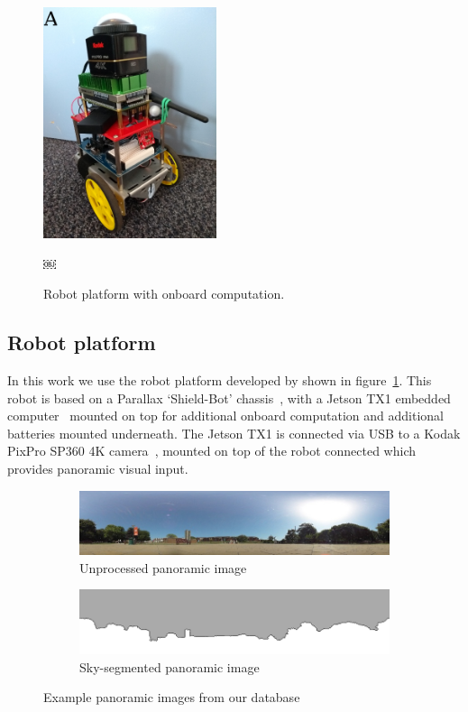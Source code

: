 \documentclass[letterpaper]{article}
\begin{document}
\begin{figure}[t]
    \centering
    \includegraphics[width=2in]{figures/robot.jpg}
    \caption{Robot platform with onboard computation.}￼
    \label{fig:robot}
\end{figure}

\subsection{Robot platform}
\label{sec:robot_platform}
In this work we use the robot platform developed by \citet{Domcsek2018} shown in figure~\ref{fig:robot}.
This robot is based on a Parallax `Shield-Bot' chassis~\citep{ParallaxInc}, with a Jetson TX1 embedded computer~\citep{NVIDIACorporation2016} mounted on top for additional onboard computation and additional batteries mounted underneath. 
The Jetson TX1 is connected via USB to a Kodak PixPro SP360 4K camera~\citep{JKImagingLtd}, mounted on top of the robot connected which provides panoramic visual input.

\begin{figure}[t]
    \begin{subfigure}[b]{\columnwidth}
        \includegraphics[width=\columnwidth]{figures/360_240.jpg}
        \caption{Unprocessed panoramic image}
    \end{subfigure}
    \begin{subfigure}[b]{\columnwidth}
        \includegraphics[width=\columnwidth]{figures/360_240_mask.png}
        \caption{Sky-segmented panoramic image}
    \end{subfigure}
    \caption{Example panoramic images from our database}
    \label{fig:database_images}
\end{figure}
\end{document}
